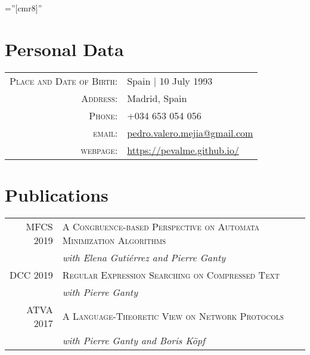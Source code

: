 \documentclass[a4paper,10pt]{article} %
\begin{document}
\pagestyle{empty} %

\font\fb=''[cmr8]'' %


\par{\bigskip\par} %

\section{Personal Data}

\begin{tabular}{rl}
\textsc{Place and Date of Birth:} & Spain  | 10 July 1993 \\
\textsc{Address:} & Madrid, Spain \\
\textsc{Phone:} & +034 653 054 056\\
\textsc{email:} & \href{mailto:pedro.valero.mejia@gmail.com}{pedro.valero.mejia@gmail.com} \\
\textsc{webpage:} & \href{https://pevalme.github.io/}{https://pevalme.github.io/}\\
\end{tabular}


\section{Publications}
\begin{tabular}{rl}
\textsc{MFCS} 2019 & \textsc{A Congruence-based Perspective on Automata Minimization Algorithms} \\
 & \textit{with Elena Gutiérrez and Pierre Ganty} \\
\textsc{DCC} 2019 & \textsc{Regular Expression Searching on Compressed Text} \\
 & \textit{with Pierre Ganty} \\
\textsc{ATVA} 2017 & \textsc{A Language-Theoretic View on Network Protocols} \\
& \textit{with Pierre Ganty and Boris Köpf} \\
\end{tabular}
\end{document}
